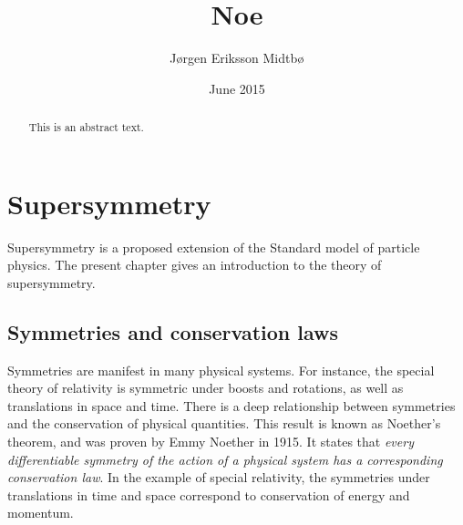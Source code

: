 \documentclass[twoside,english]{uiofysmaster}
\author{J\o rgen Eriksson Midtb\o}
\title{Noe}
\date{June 2015}
\begin{document}

\cleardoublepage

\begin{abstract}
This is an abstract text.
\end{abstract}



\tableofcontents
\listoffigures
\listoftables



\chapter{Supersymmetry}%
\label{ch:susyintro}

Supersymmetry is a proposed extension of the Standard model of particle physics. The present chapter gives an introduction to the theory of supersymmetry. %

\section{Symmetries and conservation laws}
Symmetries are manifest in many physical systems. For instance, the special theory of relativity is symmetric under boosts and rotations, as well as translations in space and time. There is a deep relationship between symmetries and the conservation of physical quantities. This result is known as Noether's theorem, and was proven by Emmy Noether in 1915. It states that {\it every differentiable symmetry of the action of a physical system has a corresponding conservation law}. In the example of special relativity, the symmetries under translations in time and space correspond to conservation of energy and momentum.%
\end{document}
